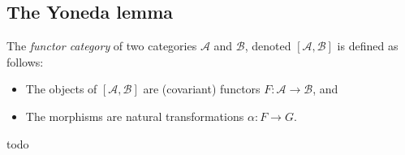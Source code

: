 \subsection{The Yoneda lemma}
\begin{definition}
    The \emph{functor category} of two categories $\mathcal{A} $ and $\mathcal{B} $, denoted $[\mathcal{A} ,\mathcal{B} ]$ is defined as follows:
    \begin{itemize}
        \item The objects of $[\mathcal{A} ,\mathcal{B} ]$ are (covariant) functors $F \colon \mathcal{A}  \to \mathcal{B} $, and 
        \item The morphisms are natural transformations $\alpha \colon F \to G$.
    \end{itemize}
\end{definition}
todo
